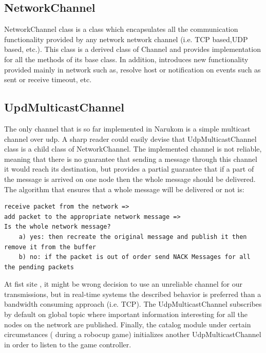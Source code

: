\subsection{NetworkChannel}
NetworkChannel class is a class which encapsulates all the communication functionality provided by any network network channel (i.e. TCP based,UDP based, etc.). This class is a derived class of Channel  and provides implementation for all the methods of its base class. In addition,  introduces new functionality provided mainly in network such as, resolve host or notification on events such as sent or receive timeout, etc.
\subsection{UpdMulticastChannel}
The only channel that is so far implemented in Narukom is a simple multicast channel over udp. A sharp reader could easily devise that UdpMulticastChannel class is a child class of NetworkChannel. The implemented channel is not reliable, meaning that there is no guarantee that sending a message through this channel it would reach its destination, but provides a partial guarantee that if a part of the message is arrived on one node then the whole message should be delivered. The algorithm that ensures that a whole message will be delivered or not is:
\begin{verbatim}
receive packet from the network =>
add packet to the appropriate network message =>
Is the whole network message?
	a) yes: then recreate the original message and publish it then remove it from the buffer
	b) no: if the packet is out of order send NACK Messages for all the pending packets
\end{verbatim}

 At fist site , it might be wrong decision to use an unreliable channel for our transmissions, but in real-time systems the described behavior is preferred than a bandwidth consuming approach (i.e. TCP). The UdpMulticastChannel subscribes by default on global topic where important information interesting for all the nodes on the network are published. Finally, the catalog module under certain circumstances ( during a robocup game) initializes another UdpMulticastChannel in order to listen to the game controller.


